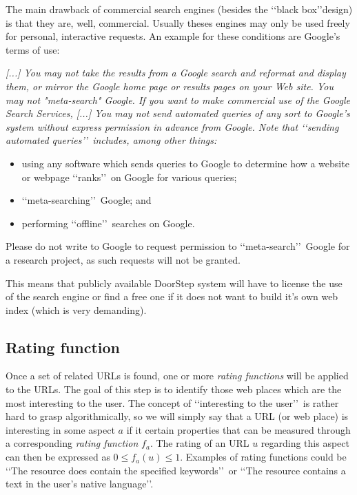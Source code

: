 \documentclass[a4paper]{danarticle}
\theoremstyle{remark}
\begin{document}
       The main drawback of commercial search engines (besides the \lq\lq black 
       box\rq\rq design) is that they are, well, commercial. Usually theses 
       engines may only be used freely for personal, interactive requests. An 
       example for these conditions are Google's terms of use\cite{googletou}:
       \begin{center}
       \begin{minipage}{10cm}
       \itshape
       [...] You may not take the
       results from a Google search and reformat and display them, or mirror
       the Google home page or results pages on your Web site. You may not
       "meta-search" Google. If you want to make commercial use of the Google
       Search Services, 
       [...]
       You may not send automated queries of any sort to Google's system
       without express permission in advance from Google. Note that 
       \lq\lq sending
       automated queries\rq\rq\ includes, among other things:
       \begin{itemize}
       \item{using any software which sends queries to Google to determine how
             a website or webpage \lq\lq ranks\rq\rq\ on Google for various 
             queries;}
       \item{\lq\lq meta-searching\rq\rq\ Google; and}
       \item{performing \lq\lq offline\rq\rq\ searches on Google.}
       \end{itemize}
       Please do not write to Google to request permission to 
       \lq\lq meta-search\rq\rq\
       Google for a research project, as such requests will not be granted.
       \end{minipage}
       \end{center}
       This means that publicly available DoorStep system will have to license 
       the use of the search engine or find a free one if it does not want to 
       build it's own web index (which is very demanding).
     \subsection{Rating function}
       Once a set of related URLs is found, one or more 
       \textit{rating functions} will be applied to the URLs. The goal
       of this step is to identify those web places which are the
       most interesting to the user. The concept of \lq\lq interesting to the
       user\rq\rq\ is rather hard to grasp algorithmically, so we will simply 
       say that a URL (or web place) is
       interesting in some aspect $ a $ if it certain properties that can be
       measured through a corresponding \textit{rating function} 
       $ f_a $. The rating of an URL $ u $ regarding this aspect
       can then be expressed as $ 0 \leq f_a(u) \leq 1 $.
       Examples of rating
       functions could be \lq\lq The resource does contain the specified
       keywords\rq\rq\ or \lq\lq The resource contains a text in the user's
       native language\rq\rq .
       
\end{document}
